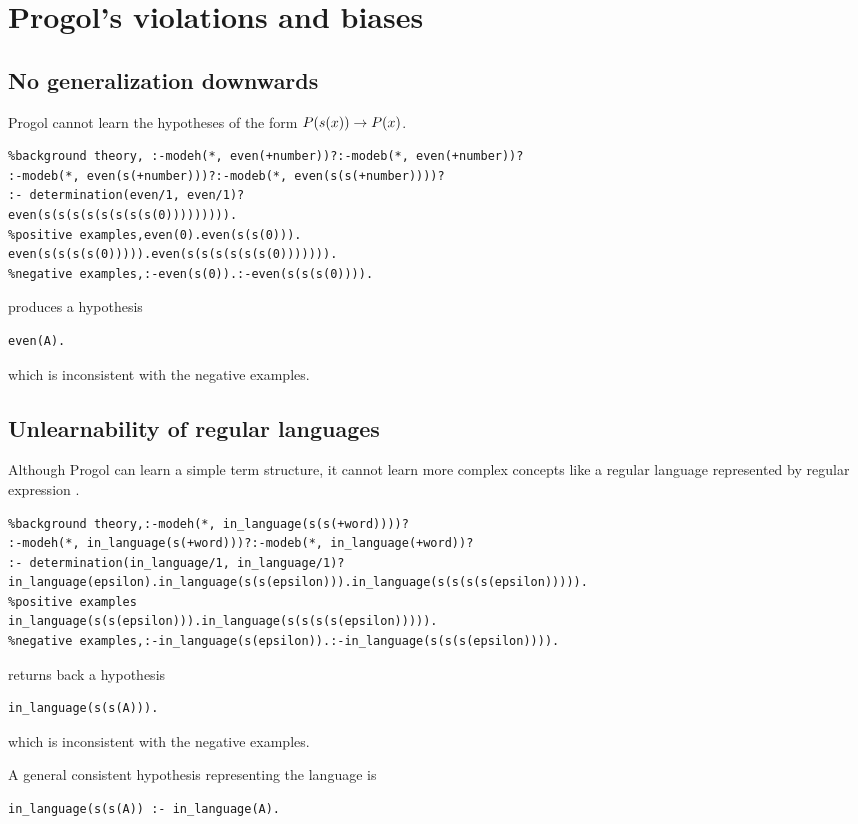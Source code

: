 \section{Progol's violations and biases}
\subsection{No generalization downwards}
Progol cannot learn the hypotheses of the form $P(s(x)) \to P(x)$.

\begin{lstlisting}
%background theory, :-modeh(*, even(+number))?:-modeb(*, even(+number))?
:-modeb(*, even(s(+number)))?:-modeb(*, even(s(s(+number))))?
:- determination(even/1, even/1)?
even(s(s(s(s(s(s(s(s(0))))))))).
%positive examples,even(0).even(s(s(0))).
even(s(s(s(s(0))))).even(s(s(s(s(s(s(0))))))).
%negative examples,:-even(s(0)).:-even(s(s(s(0)))).
\end{lstlisting}
produces a hypothesis
\begin{lstlisting}
even(A).
\end{lstlisting}
which is inconsistent with the negative examples.

\subsection{Unlearnability of regular languages}
Although Progol can learn a simple term structure, it cannot learn more complex concepts like a regular language represented by regular expression .

\begin{lstlisting}
%background theory,:-modeh(*, in_language(s(s(+word))))?
:-modeh(*, in_language(s(+word)))?:-modeb(*, in_language(+word))?
:- determination(in_language/1, in_language/1)?
in_language(epsilon).in_language(s(s(epsilon))).in_language(s(s(s(s(epsilon))))).
%positive examples
in_language(s(s(epsilon))).in_language(s(s(s(s(epsilon))))).
%negative examples,:-in_language(s(epsilon)).:-in_language(s(s(s(epsilon)))).
\end{lstlisting}
returns back a hypothesis
\begin{lstlisting}
in_language(s(s(A))).
\end{lstlisting}
which is inconsistent with the negative examples.

A general consistent hypothesis representing the language is
\begin{lstlisting}
in_language(s(s(A)) :- in_language(A).
\end{lstlisting}


